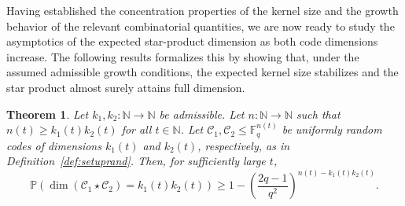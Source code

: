 \documentclass[a4paper,11pt,reqno]{article}
\newcommand{\F}{\mathbb{F}}
\newcommand{\C}{\mathcal{C}}
\theoremstyle{plain} \numberwithin{equation}{section}
\newtheorem{theorem}{Theorem}[section]
\theoremstyle{definition}
\begin{document}
Having established the concentration properties of the kernel size and the growth behavior of the relevant combinatorial quantities, we are now ready to study the asymptotics of the expected star-product dimension as both code dimensions increase. The following results formalizes this by showing that, under the assumed admissible growth conditions, the expected kernel size stabilizes and the star product almost surely attains full dimension.
\\

\begin{theorem}\label{thm:expectedink}Let $k_1,k_2\colon \mathbb{N}\rightarrow \mathbb{N}$ be admissible. Let $n\colon \mathbb{N}\rightarrow \mathbb{N}$ such that $n(t) \geq k_1(t)k_2(t)$ for all $t\in \mathbb{N}$. Let $\C_1, \C_2 \leq \F_q^{n(t)}$ be uniformly random codes of dimensions $k_1(t)$ and $k_2(t)$, respectively, as in Definition~\ref{def:setuprand}. Then, for sufficiently large $t$, 
\[
\mathbb{P}\left( \dim (\C_1\star\C_2) = k_1(t) k_2(t) \right) \geq 1 - \left(\frac{2q-1}{q^2}\right)^{n(t)-k_1(t)k_2(t)}.
\]
\end{theorem}
\end{document}
